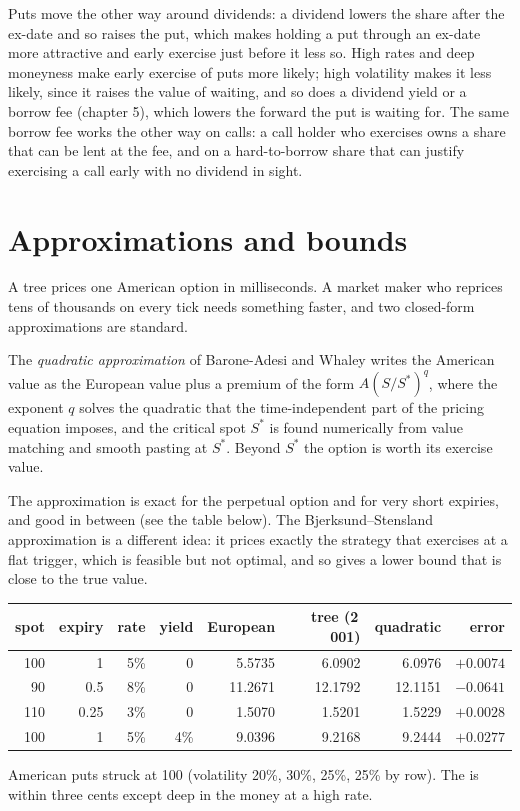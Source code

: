 Puts move the other way around dividends: a dividend lowers the share after the ex-date
and so raises the put, which makes holding a put through an ex-date more attractive and
early exercise just before it less so. High rates and deep moneyness make early exercise of
puts more likely; high volatility makes it less likely, since it raises the value of
waiting, and so does a dividend yield or a borrow fee (chapter 5), which lowers the forward
the put is waiting for. The same borrow fee works the other way on calls: a call holder who
exercises owns a share that can be lent at the fee, and on a hard-to-borrow share that can
justify exercising a call early with no dividend in sight.

\section{Approximations and bounds}

A tree prices one American option in milliseconds. A market maker who reprices tens of
thousands on every tick needs something faster, and two closed-form approximations are
standard.

\begin{definition}\label{def:dv:american-options-and-early-exercise:baw}
The \emph{quadratic approximation} of Barone-Adesi and Whaley
writes the American value as the European value plus a premium of the form $A(S/S^*)^{q}$,
where the exponent $q$ solves the quadratic that the time-independent part of the pricing
equation imposes, and the critical spot $S^*$ is found numerically from value matching
and smooth pasting at $S^*$. Beyond $S^*$ the option is worth its exercise value.
\end{definition}

The approximation is exact for the perpetual option and for very short expiries, and good
in between (see the table below). The Bjerksund--Stensland approximation is a different
idea: it prices exactly the strategy that exercises at a flat trigger, which is feasible
but not optimal, and so gives a lower bound that is close to the true value.

\begin{center}
\footnotesize
\begin{tabular}{@{}rrrrrrrr@{}}
\toprule
spot & expiry & rate & yield & European & tree (2\,001) & quadratic & error \\
\midrule
100 & 1 & 5\% & 0 & 5.5735 & 6.0902 & 6.0976 & $+0.0074$ \\
90 & 0.5 & 8\% & 0 & 11.2671 & 12.1792 & 12.1151 & $-0.0641$ \\
110 & 0.25 & 3\% & 0 & 1.5070 & 1.5201 & 1.5229 & $+0.0028$ \\
100 & 1 & 5\% & 4\% & 9.0396 & 9.2168 & 9.2444 & $+0.0277$ \\
\bottomrule
\end{tabular}

\smallskip
American puts struck at 100 (volatility 20\%, 30\%, 25\%, 25\% by row). The
 is within three cents except deep in the money at a high rate.
\end{center}

